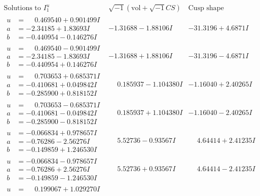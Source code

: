 \documentclass[1p]{elsarticle_modified}
\theoremstyle{definition}
\newcommand{\I}{\sqrt{-1}}
\begin{document}
$$\begin{array}{c|c|c}  
\text{Solutions to }I^u_{1}& \I (\text{vol} + \sqrt{-1}CS) & \text{Cusp shape}\\
 \hline 
\begin{aligned}
u &= \phantom{-}0.469540 + 0.901499 I \\
a &= -2.34185 + 1.83693 I \\
b &= -0.440954 - 0.146276 I\end{aligned}
 & -1.31688 - 1.88106 I & -31.3196 + 4.6871 I \\ \hline\begin{aligned}
u &= \phantom{-}0.469540 - 0.901499 I \\
a &= -2.34185 - 1.83693 I \\
b &= -0.440954 + 0.146276 I\end{aligned}
 & -1.31688 + 1.88106 I & -31.3196 - 4.6871 I \\ \hline\begin{aligned}
u &= \phantom{-}0.703653 + 0.685371 I \\
a &= -0.410681 + 0.049842 I \\
b &= -0.285900 + 0.818152 I\end{aligned}
 & \phantom{-}0.185937 - 1.104380 I & -1.16040 + 2.40265 I \\ \hline\begin{aligned}
u &= \phantom{-}0.703653 - 0.685371 I \\
a &= -0.410681 - 0.049842 I \\
b &= -0.285900 - 0.818152 I\end{aligned}
 & \phantom{-}0.185937 + 1.104380 I & -1.16040 - 2.40265 I \\ \hline\begin{aligned}
u &= -0.066834 + 0.978657 I \\
a &= -0.76286 - 2.56276 I \\
b &= -0.149859 + 1.246530 I\end{aligned}
 & \phantom{-}5.52736 - 0.93567 I & \phantom{-}4.64414 + 2.41235 I \\ \hline\begin{aligned}
u &= -0.066834 - 0.978657 I \\
a &= -0.76286 + 2.56276 I \\
b &= -0.149859 - 1.246530 I\end{aligned}
 & \phantom{-}5.52736 + 0.93567 I & \phantom{-}4.64414 - 2.41235 I \\ \hline\begin{aligned}
u &= \phantom{-}0.199067 + 1.029270 I \\

\end{aligned}
\end{array}$$
\end{document}
